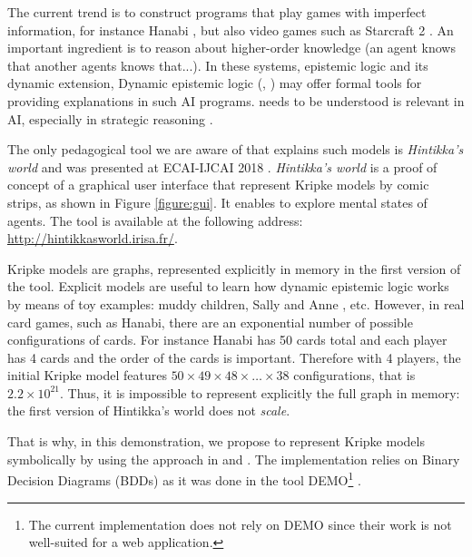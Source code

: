 The current trend is to construct programs that play games with imperfect information, for instance Hanabi \cite{DBLP:journals/corr/abs-1902-00506}, but also video games such as Starcraft 2 \cite{DBLP:conf/ijcai/HuLLPX18}. An important ingredient is to reason about higher-order knowledge (an agent knows that another agents knows that...). In these systems, epistemic logic and its dynamic extension, Dynamic epistemic logic (\cite{baltag1998logic}, \cite{DitmarschvdHoekKooi}) may offer formal tools for providing explanations in such AI programs. needs to be understood is relevant in AI, especially in strategic reasoning \cite{DBLP:journals/ijgt/Aumann99}.

The only pedagogical tool we are aware of that explains such models is \emph{Hintikka's world} and was presented at ECAI-IJCAI 2018 \cite{DBLP:conf/ijcai/Schwarzentruber18}. 
\emph{Hintikka's world} is a proof of concept of a graphical user interface that represent Kripke models by  comic strips, as shown in Figure \ref{figure:gui}. It enables to explore mental states of agents. The tool is available at the following address:
\url{http://hintikkasworld.irisa.fr/}. 


Kripke models are graphs, represented explicitly in memory in the first version of the tool. Explicit models are useful to learn how dynamic epistemic logic works by means of toy examples: muddy children, Sally and Anne  \cite{wimmer1983beliefs}, etc.  However, in real card games, such as Hanabi, there are an exponential number of possible configurations of cards. For instance Hanabi has 50 cards total and each player has 4 cards and the order of the cards is important. Therefore with 4 players, the initial Kripke model features $50 \times 49 \times 48 \times \dots \times 38$ configurations, that is $2.2 \times 10^{21}$. Thus, it is impossible to represent explicitly the full graph in memory:  the first version of Hintikka's world does not \emph{scale}. 

That is why, in this demonstration, we propose to represent Kripke models symbolically by using the approach in \cite{DBLP:conf/atal/CharrierS17} and \cite{DBLP:conf/aiml/CharrierS18}. The implementation relies on Binary Decision Diagrams (BDDs) \cite{DBLP:journals/tc/Bryant86} as it was done in the tool DEMO\footnote{The current implementation does not rely on DEMO since their work is not well-suited for a web application.}  \cite{DBLP:conf/lori/BenthemEGS15}. %






